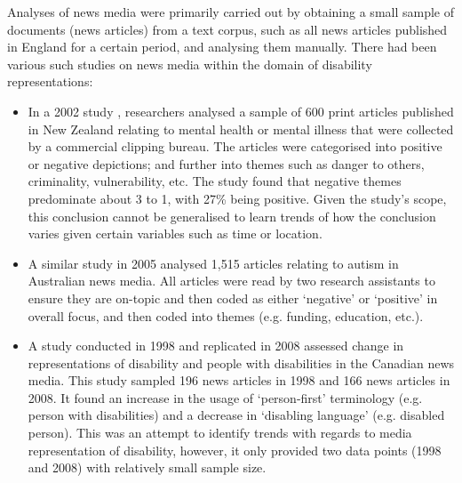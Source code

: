 \documentclass{report}
\begin{document}
Analyses of news media were primarily carried out by obtaining a small sample of documents (news articles) from a text corpus, such as all news articles published in England for a certain period, and analysing them manually. There had been various such studies on news media within the domain of disability representations:
\begin{itemize}
	\item In a 2002 study \cite{coverdale2002depictions}, researchers analysed a sample of 600 print articles published in New Zealand relating to mental health or mental illness that were collected by a commercial clipping bureau.
		The articles were categorised into positive or negative depictions; and further into themes such as danger to others, criminality, vulnerability, etc.
		The study found that negative themes predominate about 3 to 1, with 27\% being positive.
		Given the study's scope, this conclusion cannot be generalised to learn trends of how the conclusion varies given certain variables such as time or location.
	\item A similar study in 2005 \cite{jones2009representations} analysed 1,515 articles relating to autism in Australian news media.
		All articles were read by two research assistants to ensure they are on-topic and then coded as either `negative' or `positive' in overall focus, and then coded into themes (e.g. funding, education, etc.).
	\item A study conducted in 1998 \cite{gold1999media} and replicated in 2008 \cite{devotta2013representations} assessed change in representations of disability and people with disabilities in the Canadian news media.
		This study sampled 196 news articles in 1998 and 166 news articles in 2008.
		It found an increase in the usage of `person-first' terminology (e.g. person with disabilities) and a decrease in `disabling language' (e.g. disabled person). %
		This was an attempt to identify trends with regards to media representation of disability, however, it only provided two data points (1998 and 2008) with relatively small sample size.
\end{itemize}
\end{document}
